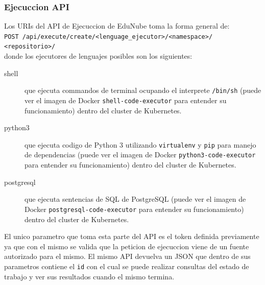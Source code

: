 \subsubsection{Ejecuccion API}
Los URIs del API de Ejecuccion de EduNube toma la forma general de: \\
\texttt{POST /api/execute/create/<lenguage\_ejecutor>/<namespace>/} \\
\texttt{<repositorio>/} \\
donde los ejecutores de lenguajes posibles son los siguientes:
\begin{description}
	\item[shell] que ejecuta commandos de terminal ocupando el interprete \texttt{/bin/sh} (puede ver el imagen de Docker \texttt{shell-code-executor} para entender su funcionamiento) dentro del cluster de Kubernetes.
	\item[python3] que ejecuta codigo de Python 3 utilizando \texttt{virtualenv} y \texttt{pip} para manejo de dependencias (puede ver el imagen de Docker \texttt{python3-code-executor} para entender su funcionamiento) dentro del cluster de Kubernetes.
	\item[postgresql] que ejecuta sentencias de SQL de PostgreSQL (puede ver el imagen de Docker \texttt{postgresql-code-executor} para entender su funcionamiento) dentro del cluster de Kubernetes.
\end{description}
El unico parametro que toma esta parte del API es el token definida previamente ya que con el mismo se valida que la peticion de ejecuccion viene de un fuente autorizado para el mismo. El mismo API devuelva un JSON que dentro de sus parametros contiene el \texttt{id} con el cual se puede realizar consultas del estado de trabajo y ver sus resultados cuando el mismo termina.
